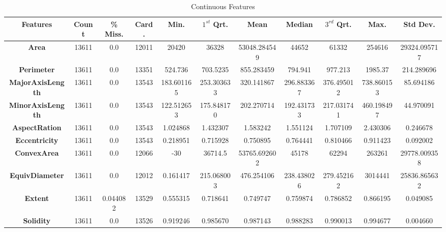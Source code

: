 \documentclass[10pt, conference]{IEEEtran}
\begin{document}
\begin{table}[h!]
    \caption{Continuous Features}
    \begin{center}
    \begin{tabular}{|c||c|c|c|c|c|c|c|c|c|c|}
        \hline
        \textbf{Features}&\textbf{Count}&\textbf{\% Miss.}&\textbf{Card.}&\textbf{Min.}&\textbf{$1^{st}$ Qrt.}&\textbf{Mean}&\textbf{Median}&\textbf{$3^{rd}$ Qrt.}&\textbf{Max}.&\textbf{Std Dev.}\\
        \hline
        \textbf{Area}               &13611  &0.0       &12011   &20420      &36328      &53048.284549 &44652      &61332      &254616     &29324.095717\\
        \textbf{Perimeter}          &13611  &0.0       &13351   &524.736    &703.5235   &855.283459   &794.941    &977.213    &1985.37    &214.289696\\
        \textbf{MajorAxisLength}    &13611  &0.0       &13543   &183.601165 &253.303633 &320.141867   &296.883367 &376.495012 &738.860153 &85.694186\\
        \textbf{MinorAxisLength}    &13611  &0.0       &13543   &122.512653 &175.848170	&202.270714   &192.431733 &217.031741 &460.198497 &44.970091\\
        \textbf{AspectRation}       &13611  &0.0       &13543   &1.024868   &1.432307   &1.583242     &1.551124   &1.707109	  &2.430306   &0.246678\\
        \textbf{Eccentricity}       &13611  &0.0       &13543   &0.218951   &0.715928   &0.750895     &0.764441	  &0.810466	  &0.911423   &0.092002\\
        \textbf{ConvexArea}         &13611  &0.0       &12066   &-30        &36714.5    &53765.692602 &45178      &62294      &263261     &29778.009358\\
        \textbf{EquivDiameter}      &13611  &0.0       &12012   &0.161417   &215.068003 &476.254106   &238.438026 &279.452162 &3014441    &25836.865632\\
        \textbf{Extent}             &13611  &0.044082  &13529   &0.555315   &0.718641   &0.749747     &0.759874   &0.786852	  &0.866195	  &0.049085\\
        \textbf{Solidity}           &13611  &0.0       &13526   &0.919246	&0.985670	&0.987143     &0.988283   &0.990013   &0.994677   &0.004660	\\

\end{tabular}
\end{center}
\end{table}
\end{document}
